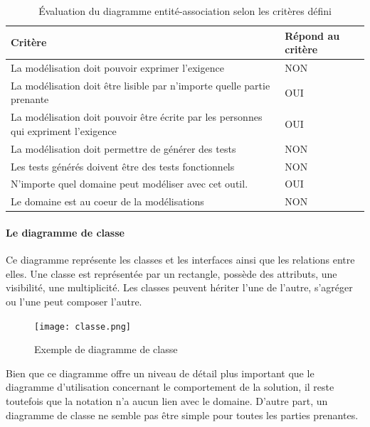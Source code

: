             \begin{table}[H]
            \centering
             \begin{tabular}{|p{25em}|p{5em}|} 
             \hline
            Critère & Répond au critère \\ [0.5ex] 
             \hline
             La modélisation doit pouvoir exprimer l’exigence & \cellcolor[HTML]{D03737}NON\\
             \hline
            La modélisation doit être lisible par n’importe quelle partie prenante & \cellcolor[HTML]{699A73}OUI\\
             \hline
            La modélisation doit pouvoir être écrite par les personnes qui expriment l’exigence &\cellcolor[HTML]{699A73} OUI \\
             \hline
            La modélisation doit permettre de générer des tests & \cellcolor[HTML]{D03737}NON \\
             \hline
            Les tests générés doivent être des tests fonctionnels &\cellcolor[HTML]{D03737} NON\\ 
             \hline
            N’importe quel domaine peut modéliser avec cet outil.&\cellcolor[HTML]{699A73} OUI\\ 
             \hline
            Le domaine est au coeur de la modélisations &\cellcolor[HTML]{D03737} NON\\ 
            \hline 
            \end{tabular}
            \caption{Évaluation du diagramme entité-association selon les critères défini}
            \end{table}


        \paragraph{Le diagramme de classe}
        
        Ce diagramme représente les classes et les interfaces ainsi que les relations entre elles. Une classe est représentée par un rectangle, possède des attributs, une visibilité, une multiplicité. Les classes peuvent hériter l'une de l'autre, s'agréger ou l'une peut composer l'autre.
    
        \begin{figure}[H]
            \centering
            \texttt{[image: classe.png]}
            \caption{Exemple de diagramme de classe}
        \end{figure}

        Bien que ce diagramme offre un niveau de détail plus important que le diagramme d'utilisation concernant le comportement de la solution, il reste toutefois que la notation n'a aucun lien avec le domaine. D'autre part, un diagramme de classe ne semble pas être simple pour toutes les parties prenantes. 

